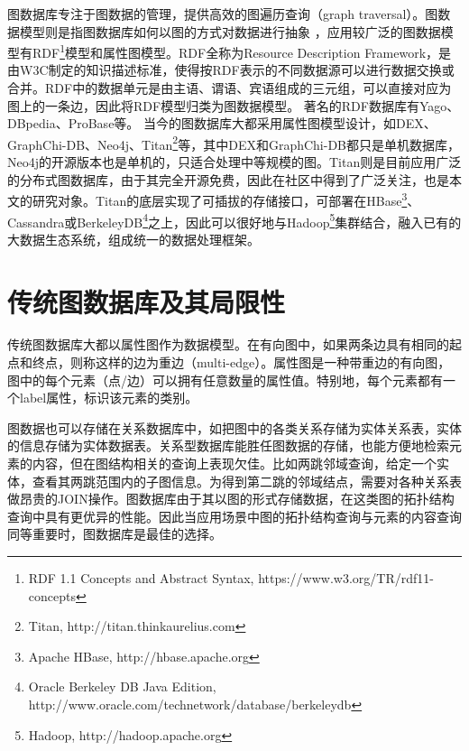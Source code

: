 图数据库专注于图数据的管理，提供高效的图遍历查询（graph traversal）。图数据模型则是指图数据库如何以图的方式对数据进行抽象 \supercite{graph_models_survey}，应用较广泛的图数据模型有RDF\footnote{RDF 1.1 Concepts and Abstract Syntax, https://www.w3.org/TR/rdf11-concepts }模型和属性图\supercite{property_graph}模型。RDF全称为Resource Description Framework，是由W3C制定的知识描述标准，使得按RDF表示的不同数据源可以进行数据交换或合并。RDF中的数据单元是由主语、谓语、宾语组成的三元组，可以直接对应为图上的一条边，因此将RDF模型归类为图数据模型。
著名的RDF数据库有Yago\supercite{yago}、DBpedia\supercite{dbpedia}、ProBase\supercite{probase}等。
当今的图数据库大都采用属性图模型设计\supercite{graph_database_models}，如DEX\supercite{DEX}、GraphChi-DB\supercite{graphchi-db}、Neo4j\supercite{neo4j}、Titan\footnote{Titan, http://titan.thinkaurelius.com}等，其中DEX和GraphChi-DB都只是单机数据库，Neo4j的开源版本也是单机的，只适合处理中等规模的图。Titan则是目前应用广泛的分布式图数据库，由于其完全开源免费，因此在社区中得到了广泛关注，也是本文的研究对象。Titan的底层实现了可插拔的存储接口，可部署在HBase\footnote{Apache HBase, http://hbase.apache.org }、Cassandra\supercite{cassandra}或BerkeleyDB\footnote{Oracle Berkeley DB Java Edition, http://www.oracle.com/technetwork/database/berkeleydb }之上，因此可以很好地与Hadoop\footnote{Hadoop, http://hadoop.apache.org }集群结合，融入已有的大数据生态系统，组成统一的数据处理框架。

\section{传统图数据库及其局限性}
传统图数据库大都以属性图作为数据模型。在有向图中，如果两条边具有相同的起点和终点，则称这样的边为重边（multi-edge）。属性图\supercite{property_graph}是一种带重边的有向图，图中的每个元素（点/边）可以拥有任意数量的属性值。特别地，每个元素都有一个label属性，标识该元素的类别。

图数据也可以存储在关系数据库中，如把图中的各类关系存储为实体关系表，实体的信息存储为实体数据表。关系型数据库能胜任图数据的存储，也能方便地检索元素的内容，但在图结构相关的查询上表现欠佳。比如两跳邻域查询，给定一个实体，查看其两跳范围内的子图信息。为得到第二跳的邻域结点，需要对各种关系表做昂贵的JOIN操作。图数据库由于其以图的形式存储数据，在这类图的拓扑结构查询中具有更优异的性能。因此当应用场景中图的拓扑结构查询与元素的内容查询同等重要时，图数据库是最佳的选择。

